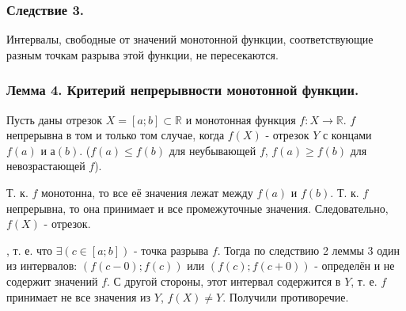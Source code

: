 \subsubsection{Следствие 3.}

Интервалы, свободные от значений монотонной функции, соответствующие разным точкам разрыва этой функции, не пересекаются.

\subsubsection{Лемма 4. Критерий непрерывности монотонной функции.}

Пусть даны отрезок $X=[a;b] \subset \mathbb{R}$ и монотонная функция $f:X \to \mathbb{R}$.
$f$ непрерывна в том и только том случае, когда $f(X)$ - отрезок $Y$ с концами $f(a)$ и $а(b)$.
($f(a) \leq f(b)$ для неубывающей $f$, $f(a) \geq f(b)$ для невозрастающей $f$).

\dokvo
\neobh

Т. к. $f$ монотонна, то все её значения лежат между $f(a)$ и $f(b)$. Т. к. $f$ непрерывна, то она принимает и все промежуточные значения. Следовательно, $f(X)$ - отрезок.

\dost

\pp, т. е. что $\exists \left(c \in [a;b]\right)$ - точка разрыва $f$.
Тогда по следствию 2 леммы 3 один из интервалов: $\left(f(c-0);f(c)\right)$ или $\left(f(c);f(c+0)\right)$ - определён и не содержит значений $f$.
С другой стороны, этот интервал содержится в $Y$, т. е. $f$ принимает не все значения из $Y$, $f(X)\neq Y$. Получили противоречие.











